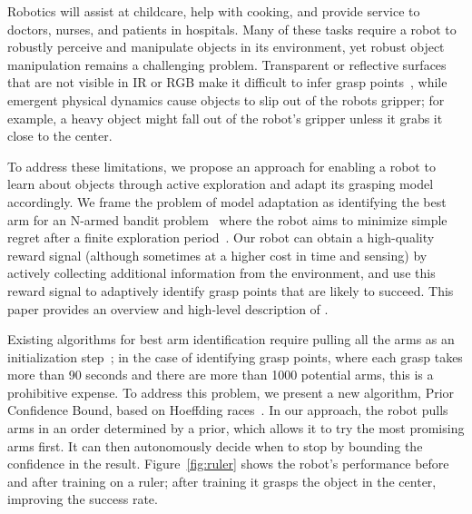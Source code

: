 \documentclass[conference,onecolumn]{IEEEtran}
\newcommand{\algorithmDTxt}{Prior Confidence Bound\xspace}
\begin{document}




%
\IEEEpeerreviewmaketitle



Robotics will assist at childcare, help with cooking, and provide
service to doctors, nurses, and patients in hospitals.  Many of these
tasks require a robot to robustly perceive and manipulate objects in
its environment, yet robust object manipulation remains a challenging
problem.  Transparent or reflective surfaces that are not visible in
IR or RGB make it difficult to infer grasp points~\citep{lysenkov13},
while emergent physical dynamics cause objects to slip out of the
robots gripper; for example, a heavy object might fall out of the
robot's gripper unless it grabs it close to the center.

To address these limitations, we propose an approach for enabling a
robot to learn about objects through active exploration and adapt its
grasping model accordingly.  We frame the problem of model adaptation
as identifying the best arm for an N-armed bandit
problem~\citep{thompson33} where the robot aims to minimize simple
regret after a finite exploration period~\citep{bubeck09}.  Our robot
can obtain a high-quality reward signal (although sometimes at a
higher cost in time and sensing) by actively collecting additional
information from the environment, and use this reward signal to
adaptively identify grasp points that are likely to succeed.  This
paper provides an overview and high-level description of
\citet{oberlin15}.

Existing algorithms for best arm identification require pulling all
the arms as an initialization step~\citep{mannor04, audibert10,
  chen14}; in the case of identifying grasp points, where each grasp
takes more than 90 seconds and there are more than 1000 potential
arms, this is a prohibitive expense.  To address this problem, we
present a new algorithm, \algorithmDTxt, based on Hoeffding
races~\citep{maron93}. In our approach, the robot pulls arms in an
order determined by a prior, which allows it to try the most promising
arms first. It can then autonomously decide when to stop by bounding
the confidence in the result.  Figure~\ref{fig:ruler} shows the
robot's performance before and after training on a ruler; after
training it grasps the object in the center, improving the success
rate.
\end{document}

